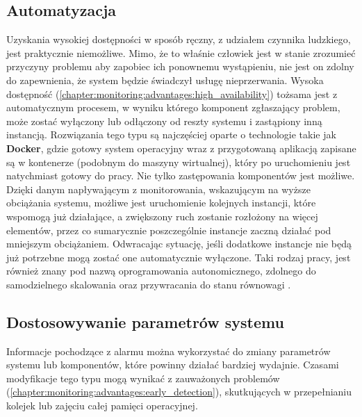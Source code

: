     \subsection{Automatyzacja}
    Uzyskania wysokiej dostępności w sposób ręczny, z udziałem czynnika ludzkiego, jest praktycznie niemożliwe.
    Mimo, że to właśnie człowiek jest w stanie zrozumieć przyczyny problemu aby zapobiec ich ponownemu wystąpieniu, 
    nie jest on zdolny do zapewnienia, że system będzie świadczył usługę nieprzerwania. Wysoka dostępność (\ref{chapter:monitoring:advantages:high_availability}) tożsama jest z automatycznym procesem, w wyniku którego
    komponent zgłaszający problem, może zostać wyłączony lub odłączony od reszty systemu i zastąpiony inną instancją.
    Rozwiązania tego typu są najczęściej oparte o technologie takie jak \textbf{Docker}, gdzie gotowy system
    operacyjny wraz z przygotowaną aplikacją zapisane są w kontenerze (podobnym do maszyny wirtualnej), który po 
    uruchomieniu jest natychmiast gotowy do pracy. Nie tylko zastępowania komponentów jest możliwe. Dzięki
    danym napływającym z monitorowania, wskazującym na wyższe obciążania systemu, możliwe jest uruchomienie
    kolejnych instancji, które wspomogą już działające, a zwiększony ruch zostanie rozłożony na więcej elementów,
    przez co sumarycznie poszczególnie instancje zaczną działać pod mniejszym obciążaniem. Odwracając sytuację, jeśli
    dodatkowe instancje nie będą już potrzebne mogą zostać one automatycznie wyłączone. Taki rodzaj pracy, jest również
    znany pod nazwą oprogramowania autonomicznego, zdolnego do samodzielnego skalowania oraz przywracania do stanu równowagi \cite{monitoring_and_alerting}.
    
    \subsection{Dostosowywanie parametrów systemu}
    Informacje pochodzące z alarmu można wykorzystać do zmiany parametrów systemu lub komponentów,
    które powinny działać bardziej wydajnie. Czasami modyfikacje tego typu mogą wynikać z zauważonych
    problemów (\ref{chapter:monitoring:advantages:early_detection}), skutkujących w przepełnianiu
    kolejek lub zajęciu całej pamięci operacyjnej. 